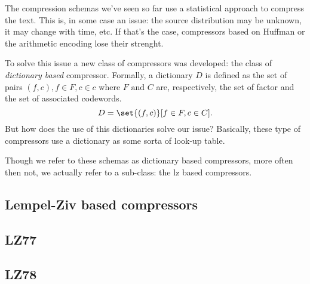 \documentclass{subfiles}
\begin{document}
    The compression schemas we've seen so far use a statistical approach to compress the text.
    This is, in some case an issue: 
        the source distribution may be unknown, 
        it may change with time, etc.
        If that's the case, compressors based on Huffman or the arithmetic encoding lose their strenght.

    To solve this issue a new class of compressors was developed: 
        the class of \emph{dictionary based} compressor.
        Formally, a dictionary \(D\) is defined as the set of pairs \((f,c),
        f \in F , c \in c\) where \(F \text{ and } C\) are, respectively,
        the set of factor and the set of associated codewords.
        \[
            D = \set{(f, c)}[f \in F, c \in C].
        \]
        But how does the use of this dictionaries solve our issue?
        Basically, these type of compressors use a dictionary as some sorta of look-up table.

    Though we refer to these schemas as dictionary based compressors, 
        more often then not, we actually refer to a sub-class: 
        the \gls{lz} based compressors.

    \subsection{Lempel-Ziv based compressors}
    

    \subsection{LZ77}
    
    \subsection{LZ78}
    
    \cleardoublepage
\end{document}
